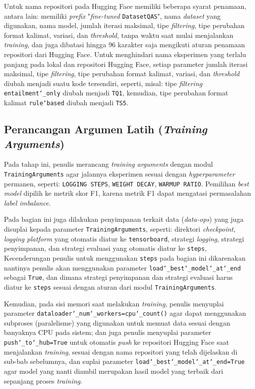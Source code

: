 Untuk nama repositori pada Hugging Face memiliki beberapa syarat penamaan, antara lain: memiliki \emph{prefix} "\emph{fine-tuned} \texttt{DatasetQAS}", nama \emph{dataset} yang digunakan, nama model, jumlah iterasi maksimal, tipe \emph{filtering}, tipe perubahan format kalimat, variasi, dan \emph{threshold}, tanpa waktu saat mulai menjalankan \emph{training}, dan juga dibatasi hingga 96 karakter saja mengikuti aturan penamaan repositori dari Hugging Face. Untuk menghindari nama eksperimen yang terlalu panjang pada lokal dan repositori Hugging Face, setiap parameter jumlah iterasi maksimal, tipe \emph{filtering}, tipe perubahan format kalimat, variasi, dan \emph{threshold} diubah menjadi suatu kode tersendiri, seperti, misal: tipe \emph{filtering} \texttt{entailment\char`_only} diubah menjadi \texttt{TQ1}, kemudian, tipe perubahan format kalimat \texttt{rule\char`based} diubah menjadi \texttt{TS5}.

\subsection{Perancangan Argumen Latih (\emph{Training Arguments})}
Pada tahap ini, penulis merancang \emph{training arguments} dengan modul \texttt{TrainingArguments} agar jalannya eksperimen sesuai dengan \emph{hyperparameter} permanen, seperti: \texttt{LOGGING STEPS}, \texttt{WEIGHT DECAY}, \texttt{WARMUP RATIO}. Pemilihan \emph{best model} dipilih ke metrik skor F1, karena metrik F1 dapat mengatasi permasalahan \emph{label imbalance}.

Pada bagian ini juga dilakukan penyimpanan terkait data (\emph{data-ops}) yang juga disuplai kepada parameter \texttt{TrainingArguments}, seperti: direktori \emph{checkpoint}, \emph{logging platform} yang otomatis diatur ke \texttt{tensorboard}, strategi \emph{logging}, strategi penyimpanan, dan strategi evaluasi yang otomatis diatur ke \texttt{steps}, Kecenderungan penulis untuk menggunakan \texttt{steps} pada bagian ini dikarenakan nantinya penulis akan menggunakan parameter \texttt{load\char`_best\char`_model\char`_at\char`_end} sebagai \texttt{True}, dan dimana strategi penyimpanan dan strategi evaluasi harus diatur ke \texttt{steps} sesuai dengan aturan dari modul \texttt{TrainingArguments}.

Kemudian, pada sisi memori saat melakukan \emph{training}, penulis menyuplai parameter \texttt{dataloader\char`_num\char`_workers=cpu\char`_count()} agar dapat menggunakan subproses (paralelisme) yang digunakan untuk memuat data sesuai dengan banyaknya CPU pada sistem; dan juga penulis menyuplai parameter \texttt{push\char`_to\char`_hub=True} untuk otomatis \emph{push} ke repositori Hugging Face saat menjalankan \emph{training}, sesuai dengan nama repositori yang telah dijelaskan di sub-bab sebelumnya, dan suplai parameter \texttt{load\char`_best\char`_model\char`_at\char`_end=True} agar model yang nanti diambil merupakan hasil model yang terbaik dari sepanjang proses \emph{training}.

